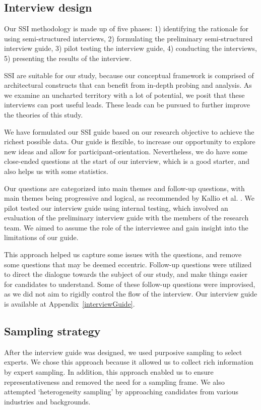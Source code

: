 \documentclass{bmcart}
\begin{document}
\subsection{Interview design} 
Our SSI methodology is made up of five phases: 1) identifying the rationale for using semi-structured interviews, 2) formulating the preliminary semi-structured interview guide, 3) pilot testing the interview guide, 4) conducting the interviews, 5) presenting the results of the interview. 

SSI are suitable for our study, because our conceptual framework is comprised of architectural constructs that can benefit from in-depth probing and analysis. As we examine an uncharted territory with a lot of potential, we posit that these interviews can post useful leads. These leads can be pursued to further improve the theories of this study.

We have formulated our SSI guide based on our research objective to achieve the richest possible data. Our guide is flexible, to increase our opportunity to explore new ideas and allow for participant-orientation. Nevertheless, we do have some close-ended questions at the start of our interview, which is a good starter, and also helps us with some statistics. 

Our questions are categorized into main themes and follow-up questions, with main themes being progressive and logical, as recommended by Kallio et al. \cite{kallio2016systematic}. We pilot tested our interview guide using internal testing, which involved an evaluation of the preliminary interview guide with the members of the research team. We aimed to assume the role of the interviewee and gain insight into the limitations of our guide.

This approach helped us capture some issues with the questions, and remove some questions that may be deemed eccentric. Follow-up questions were utilized to direct the dialogue towards the subject of our study, and make things easier for candidates to understand. Some of these follow-up questions were improvised, as we did not aim to rigidly control the flow of the interview. Our interview guide is available at Appendix~\ref{interviewGuide}.


\subsection{Sampling strategy}

After the interview guide was designed, we used purposive sampling \cite{baltes2022sampling} to select experts. We chose this approach because it allowed us to collect rich information by expert sampling. In addition, this approach enabled us to ensure representativeness and removed the need for a sampling frame. We also attempted `heterogeneity sampling' by approaching candidates from various industries and backgrounds. 
\end{document}
